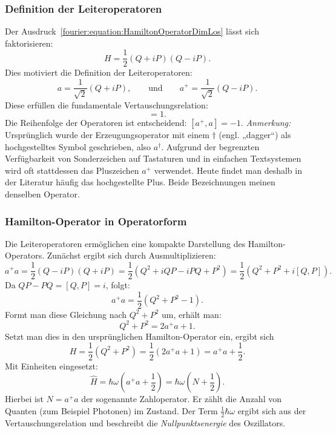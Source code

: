 		\subsubsection{Definition der Leiteroperatoren\label{fourier:subsubsection:DefinitionLeiteroperatoren}}
			Der Ausdruck~\ref{fourier:equation:HamiltonOperatorDimLos} lässt sich faktorisieren:
			\[
				H = \frac{1}{2}(Q + iP)(Q - iP).
			\]
			Dies motiviert die Definition der Leiteroperatoren:
			\begin{equation}
				a = \frac{1}{\sqrt{2}}(Q + iP),
				\qquad\text{und}\qquad
				a^+ = \frac{1}{\sqrt{2}}(Q - iP).
			\end{equation}
			Diese erfüllen die fundamentale Vertauschungsrelation:
			\begin{equation}
				[a, a^+] = 1.
			\end{equation}
			Die Reihenfolge der Operatoren ist entscheidend: $[a^+, a] = -1$.
			\textit{Anmerkung:}
			Ursprünglich wurde der Erzeugungsoperator mit einem $\dagger$ (engl. „dagger“) als hochgestelltes Symbol geschrieben, also $a^\dagger$.
			Aufgrund der begrenzten Verfügbarkeit von Sonderzeichen auf Tastaturen und in einfachen Textsystemen wird oft stattdessen das Pluszeichen $a^+$ verwendet.
			Heute findet man deshalb in der Literatur häufig das hochgestellte Plus.
			Beide Bezeichnungen meinen denselben Operator.

		\subsubsection{Hamilton-Operator in Operatorform\label{fourier:subsubsection:HamiltonOperatorInOperatorform}}
			Die Leiteroperatoren ermöglichen eine kompakte Darstellung des Hamilton-Operators.
			Zunächst ergibt sich durch Ausmultiplizieren:
			\[
				a^+a = \frac{1}{2}(Q - iP)(Q + iP) = \frac{1}{2}(Q^2 + iQP - iPQ + P^2) = \frac{1}{2}(Q^2 + P^2 + i[Q, P]).
			\]
			Da $QP - PQ = [Q, P] = i$, folgt:
			\[
				a^+a = \frac{1}{2}(Q^2 + P^2 - 1).
			\]
			Formt man diese Gleichung nach $Q^2 + P^2$ um, erhält man:
			\[
				Q^2 + P^2 = 2a^+a + 1.
			\]
			Setzt man dies in den ursprünglichen Hamilton-Operator ein, ergibt sich
			\[
				H = \frac{1}{2}(Q^2 + P^2) = \frac{1}{2}(2a^+a + 1) = a^+a + \frac{1}{2}.
			\]
			Mit Einheiten eingesetzt:
			\begin{equation}
				\hat{H} = \hbar\omega \left(a^+ a + \frac{1}{2}\right) = \hbar\omega \left(N + \frac{1}{2}\right).
			\end{equation}
			Hierbei ist $N = a^+a$ der sogenannte Zahloperator.
			Er zählt die Anzahl von Quanten (zum Beispiel Photonen) im Zustand.
			Der Term $\frac{1}{2}\hbar\omega$ ergibt sich aus der Vertauschungsrelation und beschreibt die \emph{Nullpunktsenergie} des Oszillators.
		

